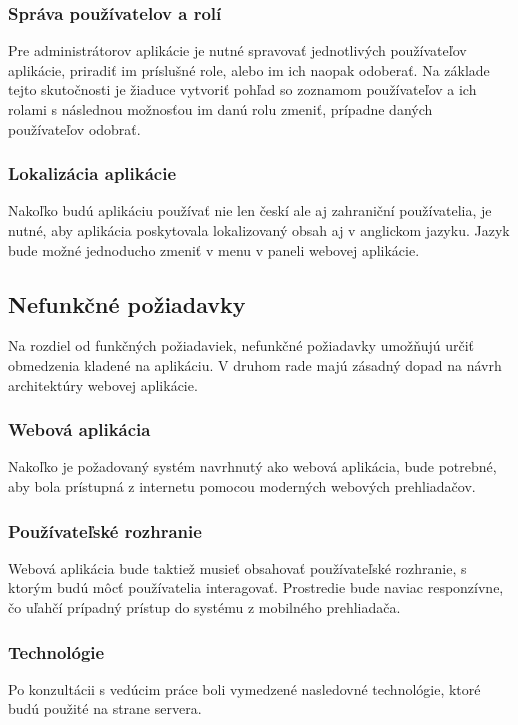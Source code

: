 \subsubsection{Správa používatelov a rolí}\label{sprava-pouzivatelov-a-roli}
Pre administrátorov aplikácie je nutné spravovať jednotlivých používateľov aplikácie, priradiť im príslušné role, alebo im ich naopak odoberať. Na základe tejto skutočnosti je žiaduce vytvoriť pohľad so zoznamom používateľov a ich rolami s následnou možnosťou im danú rolu zmeniť, prípadne daných používateľov odobrať.

\subsubsection{Lokalizácia aplikácie}
Nakoľko budú aplikáciu používať nie len českí ale aj zahraniční používatelia, je nutné, aby aplikácia poskytovala lokalizovaný obsah aj v anglickom jazyku. Jazyk bude možné jednoducho zmeniť v menu v paneli webovej aplikácie.

\subsection{Nefunkčné požiadavky}
Na rozdiel od funkčných požiadaviek, nefunkčné požiadavky umožňujú určiť obmedzenia kladené na aplikáciu. V druhom rade majú zásadný dopad na návrh architektúry webovej aplikácie.\cite{nefunkcne-poziadavky}

\subsubsection{Webová aplikácia}
Nakoľko je požadovaný systém navrhnutý ako webová aplikácia, bude potrebné, aby bola prístupná z internetu pomocou moderných webových prehliadačov.

\subsubsection{Používateľské rozhranie}
Webová aplikácia bude taktiež musieť obsahovať používateľské rozhranie, s ktorým budú môcť používatelia interagovať.
Prostredie bude naviac responzívne, čo uľahčí prípadný prístup do systému z mobilného prehliadača.

\subsubsection{Technológie}
Po konzultácii s vedúcim práce boli vymedzené nasledovné technológie, ktoré budú použité na strane servera.

